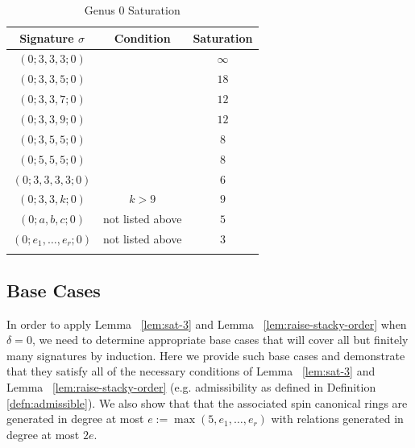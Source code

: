 \documentclass{amsart}
\theoremstyle{plain}
\theoremstyle{definition}
\theoremstyle{remark}
\numberwithin{equation}{section}
\newcommand\ssec{\subsection}
\begin{document}
\begin{longtable}
	{| c | c || c |}
	\hline
	Signature $\sigma$ & Condition & Saturation \\
	\hline
	\hline

	$(0; 3, 3, 3; 0)$ & & $\infty$ \\	\hline

	$(0; 3, 3, 5; 0)$ & & $18$ \\	\hline
	
	$(0; 3, 3, 7; 0)$ & & $12$ \\	\hline
	
	$(0; 3, 3, 9; 0)$ & & $12$ \\	\hline
	
	$(0; 3, 5, 5; 0)$ & & $8$ \\	\hline
	
	$(0; 5, 5, 5; 0)$ & & $8$ \\	\hline
	
	$(0; 3, 3, 3, 3; 0)$ & & $6$ \\	\hline
	
	\hline
	\hline
	
	$(0; 3, 3, k; 0)$ & $k > 9$ & $9$ \\	\hline
	
	$(0; a, b, c; 0)$ & not listed above & $5$ \\	\hline
	
	$(0; e_1, \ldots, e_r; 0)$ & not listed above & $3$ \\	\hline
	
	\caption{Genus 0 Saturation}
	\label{table:g-0-sat}
\end{longtable}

\ssec{Base Cases}
\label{ssec:g_0_base}
In order to apply Lemma ~\ref{lem:sat-3} and Lemma
~\ref{lem:raise-stacky-order} when $\delta = 0$,
we need to determine appropriate base cases that will
cover all but finitely many signatures by induction.
Here we provide such base cases and demonstrate that
they satisfy all of the necessary conditions of
Lemma ~\ref{lem:sat-3} and Lemma ~\ref{lem:raise-stacky-order}
(e.g. admissibility as defined in Definition \ref{defn:admissible}). We also show that that the associated spin
canonical rings are generated in degree at most $e := \max(5, e_1,
\ldots, e_r)$ with relations generated in degree at most $2e$.
\end{document}
